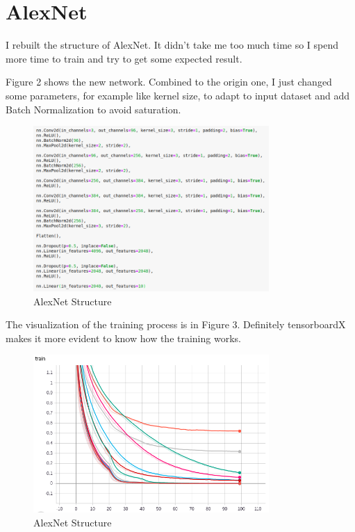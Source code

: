 \documentclass{article} %
\begin{document}
\section{AlexNet}
I rebuilt the structure of AlexNet. It didn't take me too much time so I spend more time to train and try to get some expected result. 

Figure 2 shows the new network. Combined to the origin one, I just changed some parameters, for example like kernel size, to adapt to input dataset and add Batch Normalization to avoid saturation.

\begin{figure}[ht]
	\centering  %
	\includegraphics[width=0.8\textwidth]{2.png} 
	\caption{AlexNet Structure}  %
	\label{fig:f1}   %
\end{figure}

The visualization of the training process is in Figure 3. Definitely tensorboardX makes it more evident to know how the training works.

\begin{figure}[h]
	\centering  %
	\includegraphics[width=0.8\textwidth]{5.png} 
	\caption{AlexNet Structure}  %
	\label{fig:f1}   %
\end{figure}
\end{document}
